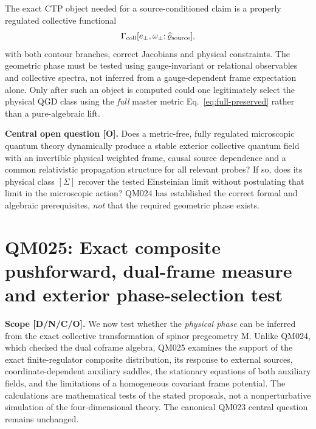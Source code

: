 \documentclass[11pt,a4paper]{article}
\begin{document}
The exact CTP object needed for a source-conditioned claim is a properly regulated collective functional\[\Gamma_{\rm coll}[e_{\pm},\omega_{\pm};\widehat\varrho_{\rm source}],\] with both contour branches, correct Jacobians and physical constraints. The geometric phase must be tested using gauge-invariant or relational observables and collective spectra, not inferred from a gauge-dependent frame expectation alone. Only after such an object is computed could one legitimately select the physical QGD class using the \emph{full} master metric Eq.~\eqref{eq:full-preserved} rather than a pure-algebraic lift.

\textbf{Central open question [O].} Does a metric-free, fully regulated microscopic quantum theory dynamically produce a stable exterior collective quantum field with an invertible physical weighted frame, causal source dependence and a common relativistic propagation structure for all relevant probes? If so, does its physical class $[\Sigma]$ recover the tested Einsteinian limit without postulating that limit in the microscopic action? QM024 has established the correct formal and algebraic prerequisites, \emph{not} that the required geometric phase exists.

\clearpage
\section{QM025: Exact composite pushforward, dual-frame measure and exterior phase-selection test}
\label{sec:v15-qm025}
\textbf{Scope [D/N/C/O].} We now test whether the \emph{physical phase} can be inferred from the exact collective transformation of spinor pregeometry M. Unlike QM024, which checked the dual coframe algebra, QM025 examines the support of the exact finite-regulator composite distribution, its response to external sources, coordinate-dependent auxiliary saddles, the stationary equations of both auxiliary fields, and the limitations of a homogeneous covariant frame potential. The calculations are mathematical tests of the stated proposals, not a nonperturbative simulation of the four-dimensional theory. The canonical QM023 central question remains unchanged.
\end{document}

